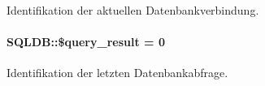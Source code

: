 Identifikation der aktuellen Datenbankverbindung. 

\hypertarget{classSQLDB_879fa41a3df6664f4ce83960808326ab}{
\paragraph[\$query\_\-result]{\setlength{\rightskip}{0pt plus 5cm}SQLDB::\$query\_\-result = 0}\hfill}
\label{classSQLDB_879fa41a3df6664f4ce83960808326ab}


Identifikation der letzten Datenbankabfrage. 

